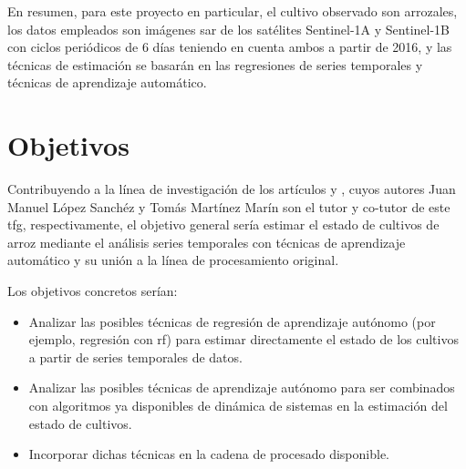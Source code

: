 \par En resumen, para este proyecto en particular, el cultivo observado son arrozales, los datos empleados son imágenes \gls{sar} de los satélites Sentinel-1A y Sentinel-1B con ciclos periódicos de 6 días teniendo en cuenta ambos a partir de 2016, y las técnicas de estimación se basarán en las regresiones de series temporales y técnicas de aprendizaje automático. 
\\

\section{Objetivos}
Contribuyendo a la línea de investigación de los artículos \cite{Juanma2014} y \cite{Juanma2016}, cuyos autores Juan Manuel López Sanchéz y Tomás Martínez Marín son el tutor y co-tutor de este \gls{tfg}, respectivamente, el objetivo general sería estimar el estado de cultivos de arroz mediante el análisis series temporales con técnicas de aprendizaje automático y su unión a la línea de procesamiento original.
\\
\par Los objetivos concretos serían: 
\begin{itemize}
	\item Analizar las posibles técnicas de regresión de aprendizaje autónomo (por ejemplo, regresión con \gls{rf}) para estimar directamente el estado de los cultivos a partir de series temporales de datos. 
	\item Analizar las posibles técnicas de aprendizaje autónomo para ser combinados con algoritmos ya disponibles de dinámica de sistemas en la estimación del estado de cultivos.
	\item Incorporar dichas técnicas en la cadena de procesado disponible.
\end{itemize}

